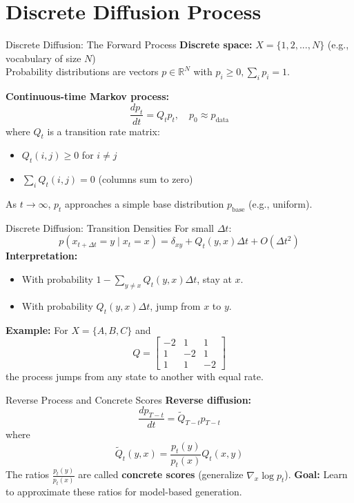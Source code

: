 \documentclass{beamer}
\begin{document}
\section{Discrete Diffusion Process}

\begin{frame}{Discrete Diffusion: The Forward Process}
  \textbf{Discrete space:} $X = \{1, 2, ..., N\}$ (e.g., vocabulary of size $N$)\\
  Probability distributions are vectors $p \in \mathbb{R}^N$ with $p_i \geq 0, \sum_i p_i = 1$.

  \vspace{1em}
  \textbf{Continuous-time Markov process:}
  \[
    \frac{d p_t}{dt} = Q_t p_t, \quad p_0 \approx p_{\text{data}}
  \]
  where $Q_t$ is a transition rate matrix:
  \begin{itemize}
    \item $Q_t(i, j) \geq 0$ for $i \neq j$
    \item $\sum_i Q_t(i, j) = 0$ (columns sum to zero)
  \end{itemize}
  \vspace{1em}
  As $t \to \infty$, $p_t$ approaches a simple base distribution $p_{\text{base}}$ (e.g., uniform).
\end{frame}

\begin{frame}{Discrete Diffusion: Transition Densities}
  For small $\Delta t$:
  \[
    p(x_{t+\Delta t} = y \mid x_t = x) = \delta_{xy} + Q_t(y, x) \Delta t + O(\Delta t^2)
  \]
  \textbf{Interpretation:}
  \begin{itemize}
    \item With probability $1 - \sum_{y \neq x} Q_t(y, x) \Delta t$, stay at $x$.
    \item With probability $Q_t(y, x) \Delta t$, jump from $x$ to $y$.
  \end{itemize}
  \vspace{1em}
  \textbf{Example:} For $X = \{A, B, C\}$ and
  \[
    Q = \begin{bmatrix}
      -2 & 1 & 1 \\
      1 & -2 & 1 \\
      1 & 1 & -2
    \end{bmatrix}
  \]
  the process jumps from any state to another with equal rate.
\end{frame}

\begin{frame}{Reverse Process and Concrete Scores}
  \textbf{Reverse diffusion:}
  \[
    \frac{d p_{T-t}}{dt} = \tilde{Q}_{T-t} p_{T-t}
  \]
  where
  \[
    \tilde{Q}_t(y, x) = \frac{p_t(y)}{p_t(x)} Q_t(x, y)
  \]
  The ratios $\frac{p_t(y)}{p_t(x)}$ are called \textbf{concrete scores} (generalize $\nabla_x \log p_t$).
  \vspace{1em}
  \textbf{Goal:} Learn to approximate these ratios for model-based generation.
\end{frame}
\end{document}
